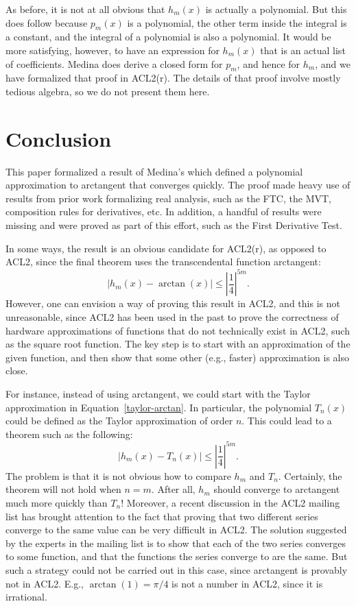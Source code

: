 \documentclass[copyright,creativecommons]{eptcs}
\begin{document}
As before, it is not at all obvious that $h_m(x)$ is actually a
polynomial. But this does follow because $p_m(x)$ is a polynomial,
the other term inside the integral is a constant, and the integral of
a polynomial is also a polynomial. It would be more satisfying,
however, to have an expression for $h_m(x)$ that is an actual list of
coefficients. Medina does derive a closed form for $p_m$, and hence
for $h_m$, and we have formalized that proof in ACL2(r). The details
of that proof involve mostly tedious algebra, so we do not present
them here.

\section{Conclusion}
\label{conclusion}

This paper formalized a result of Medina's which defined a polynomial
approximation to arctangent that converges quickly. The proof made
heavy use of results from prior work formalizing real analysis, such
as the FTC, the MVT, composition rules for derivatives, etc. In
addition, a handful of results were missing and were proved as part of
this effort, such as the First Derivative Test.

In some ways, the result is an obvious candidate for ACL2(r), as
opposed to ACL2, since the final theorem uses the transcendental
function arctangent:
\begin{equation}
\label{medina-eqn-1}
\left| h_m(x)  - \arctan(x) \right| \le \left|\frac{1}{4}\right|^{5m}.
\end{equation}
However, one can envision a way of proving this result in ACL2, and
this is not unreasonable, since ACL2 has been used in the past to
prove the correctness of hardware approximations of functions that do
not technically exist in ACL2, such as the square root function. The
key step is to start with an approximation of the given function, and
then show that some other (e.g., faster) approximation is also close.

For instance, instead of using arctangent, we could start with the
Taylor approximation in Equation~\ref{taylor-arctan}. In particular,
the polynomial $T_n(x)$ could be defined as the Taylor approximation
of order $n$. This could lead to a theorem such as the following:
\begin{equation}
\label{medina-taylor-eqn-1}
\left| h_m(x)  - T_n(x) \right| \le \left|\frac{1}{4}\right|^{5m}.
\end{equation}
The problem is that it is not obvious how to compare $h_m$ and
$T_n$. Certainly, the theorem will not hold when $n=m$.  After all,
$h_m$ should converge to arctangent much more quickly than $T_n$!
Moreover, a recent discussion in the ACL2 mailing list has brought
attention to the fact that proving that two different series converge
to the same value can be very difficult in ACL2. The solution
suggested by the experts in the mailing list is to show that each of
the two series converges to some function, and that the functions the
series converge to are the same. But such a strategy could not be
carried out in this case, since arctangent is provably not in ACL2.
E.g., $\arctan(1) = \pi/4$ is not a number in ACL2, since it is
irrational.
\end{document}
